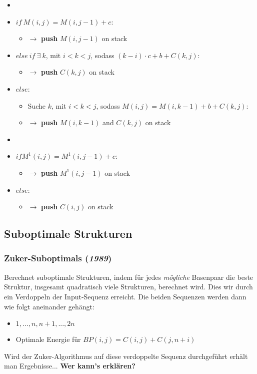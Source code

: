 \begin{itemize}
\begin{itemize}
		\item[]
		\item[] $if~M(i,j) = M(i,j-1) + c$:
			\begin{itemize}
				\item[] $\rightarrow$ \textbf{push} $M(i, j-1)$ on stack
			\end{itemize}
		\item[] $else~if~\exists~k$, mit $i < k < j$, sodass $(k-i) \cdot c + b + C(k,j)$:
			\begin{itemize}
				\item[] $\rightarrow$ \textbf{push} $C(k,j)$ on stack
			\end{itemize}
		\item[] $else$:
			\begin{itemize}
				\item[] Suche $k$, mit $i < k < j$, sodass $M(i,j) = M(i, k-1) + b + C(k,j)$:
				\item[] $\rightarrow$ \textbf{push} $M(i, k-1)$ and $C(k,j)$ on stack
			\end{itemize}
		\item[]
		\item[] $if M^1(i,j) = M^1(i,j-1) + c$:
			\begin{itemize}
				\item[] $\rightarrow$ \textbf{push} $M^1(i, j-1)$ on stack
			\end{itemize}
		\item[] $else$:
			\begin{itemize}
				\item[] $\rightarrow$ \textbf{push} $C(i, j)$ on stack
			\end{itemize}
	\end{itemize}
\end{itemize}


\subsection{Suboptimale Strukturen}

\subsubsection{ Zuker-Suboptimals (\textit{1989})}
Berechnet suboptimale Strukturen, indem für jedes \textit{m\"ogliche} Basenpaar die beste Struktur, insgesamt quadratisch viele Strukturen, berechnet wird. Dies wir durch ein Verdoppeln der Input-Sequenz erreicht. Die beiden Sequenzen werden dann wie folgt aneinander geh\"angt:
\begin{itemize}
\item[]$1, .. .,n, n+1, ..., 2n$
\item[]Optimale Energie f\"ur $BP(i,j)=C(i,j)+C(j, n+i)$
\end{itemize}
Wird der Zuker-Algorithmus auf diese verdoppelte Sequenz durchgef\"uhrt erh\"alt man Ergebnisse...\textbf{ Wer kann's erkl\"aren?}

